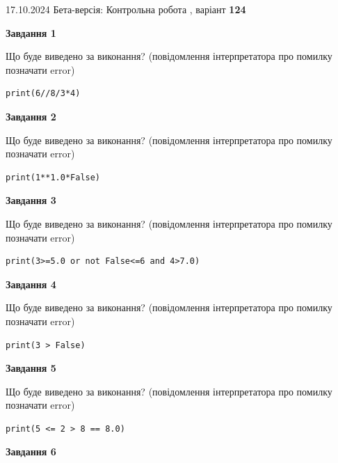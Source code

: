 \documentclass[12pt, ukrainian]{article}
\begin{document}
{\Large{17.10.2024 Бета-версія: Контрольна робота , варіант  \No \textbf { 124 }\par}}
{
\begin {large}
{\begin {center}\textbf{Завдання 1}\end {center}}

Що буде виведено за виконання? (повідомлення інтерпретатора про помилку позначати error)\par
\begin{verbatim}
print(6//8/3*4)
\end{verbatim}

{\begin {center}\textbf{Завдання 2}\end {center}}

Що буде виведено за виконання? (повідомлення інтерпретатора про помилку позначати error)\par
\begin{verbatim}
print(1**1.0*False)
\end{verbatim}

{\begin {center}\textbf{Завдання 3}\end {center}}

Що буде виведено за виконання? (повідомлення інтерпретатора про помилку позначати error)\par
\begin{verbatim}
print(3>=5.0 or not False<=6 and 4>7.0)
\end{verbatim}

{\begin {center}\textbf{Завдання 4}\end {center}}

Що буде виведено за виконання? (повідомлення інтерпретатора про помилку позначати error)\par
\begin{verbatim}
print(3 > False)
\end{verbatim}

{\begin {center}\textbf{Завдання 5}\end {center}}

Що буде виведено за виконання? (повідомлення інтерпретатора про помилку позначати error)\par
\begin{verbatim}
print(5 <= 2 > 8 == 8.0)
\end{verbatim}

{\begin {center}\textbf{Завдання 6}\end {center}}


\end{large}}
\end{document}
